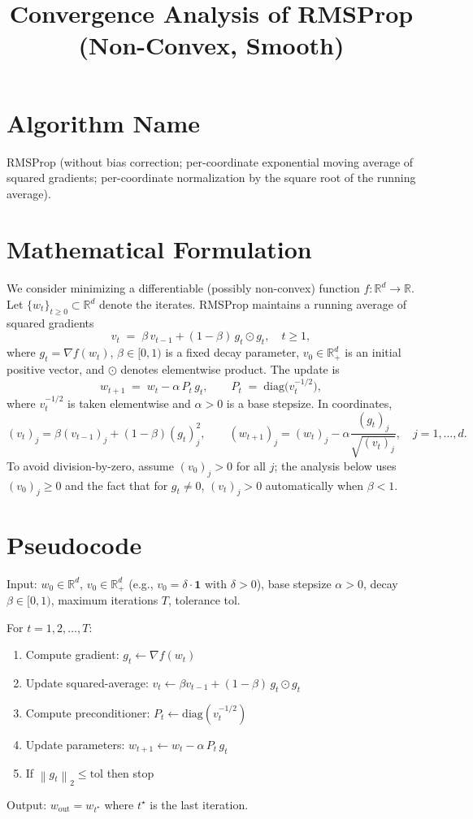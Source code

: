 \documentclass[11pt]{article}
\title{Convergence Analysis of RMSProp (Non-Convex, Smooth)}
\author{}
\date{}
\newcommand{\RR}{\mathbb{R}}
\newcommand{\one}{\mathbf{1}}
\newcommand{\diag}{\mathrm{diag}}
\newcommand{\norm}[1]{\left\lVert #1 \right\rVert}
\begin{document}
\maketitle

\section*{Algorithm Name}
RMSProp (without bias correction; per-coordinate exponential moving average of squared gradients; per-coordinate normalization by the square root of the running average).

\section*{Mathematical Formulation}
We consider minimizing a differentiable (possibly non-convex) function $f:\RR^d\to\RR$. Let $\{w_t\}_{t\ge 0}\subset\RR^d$ denote the iterates. RMSProp maintains a running average of squared gradients
\[
v_t \;=\; \beta\, v_{t-1} + (1-\beta)\, g_t \odot g_t,\quad t\ge 1,
\]
where $g_t = \nabla f(w_t)$, $\beta\in[0,1)$ is a fixed decay parameter, $v_0\in\RR_+^d$ is an initial positive vector, and $\odot$ denotes elementwise product. The update is
\[
w_{t+1} \;=\; w_t - \alpha\, P_t\, g_t,\qquad P_t \;=\; \diag\!\big( v_t^{-1/2}\big),
\]
where $v_t^{-1/2}$ is taken elementwise and $\alpha>0$ is a base stepsize. In coordinates,
\[
(v_t)_j = \beta (v_{t-1})_j + (1-\beta) (g_t)_j^2,\qquad (w_{t+1})_j = (w_t)_j - \alpha \frac{(g_t)_j}{\sqrt{(v_t)_j}},\quad j=1,\dots,d.
\]
To avoid division-by-zero, assume $(v_0)_j>0$ for all $j$; the analysis below uses $(v_0)_j\ge 0$ and the fact that for $g_t\neq 0$, $(v_t)_j>0$ automatically when $\beta<1$.

\section*{Pseudocode}
\begin{flushleft}
Input: $w_0\in\RR^d$, $v_0\in\RR_+^d$ (e.g., $v_0=\delta \cdot \one$ with $\delta>0$), base stepsize $\alpha>0$, decay $\beta\in[0,1)$, maximum iterations $T$, tolerance tol.

For $t=1,2,\dots,T$:
\begin{enumerate}
\item Compute gradient: $g_t \leftarrow \nabla f(w_t)$
\item Update squared-average: $v_t \leftarrow \beta v_{t-1} + (1-\beta)\, g_t \odot g_t$
\item Compute preconditioner: $P_t \leftarrow \diag(v_t^{-1/2})$
\item Update parameters: $w_{t+1} \leftarrow w_t - \alpha\, P_t\, g_t$
\item If $\norm{g_t}_2 \le \text{tol}$ then stop
\end{enumerate}
Output: $w_{\text{out}} = w_{t^\star}$ where $t^\star$ is the last iteration.
\end{flushleft}
\end{document}
